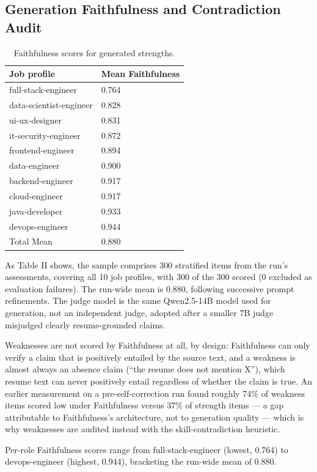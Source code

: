 \documentclass[journal]{IEEEtran}
\begin{document}
\subsection{Generation Faithfulness and Contradiction Audit}
\begin{table}[!ht]
\caption{Faithfulness scores for generated strengths.}
\label{tab_faithfulness}
\centering
\footnotesize
\begin{tabular}{ll}
\hline
Job profile & Mean Faithfulness\\
\hline
full-stack-engineer & 0.764\\
data-scientist-engineer & 0.828\\
ui-ux-designer & 0.831\\
it-security-engineer & 0.872\\
frontend-engineer & 0.894\\
data-engineer & 0.900\\
backend-engineer & 0.917\\
cloud-engineer & 0.917\\
java-developer & 0.933\\
devops-engineer & 0.944\\
Total Mean & 0.880\\
\hline
\end{tabular}
\end{table}

As Table II shows, the sample comprises 300 stratified items from the run's assessments, covering all 10 job profiles, with 300 of the 300 scored (0 excluded as evaluation failures). The run-wide mean is 0.880, following successive prompt refinements. The judge model is the same Qwen2.5-14B model used for generation, not an independent judge, adopted after a smaller 7B judge misjudged clearly resume-grounded claims.

Weaknesses are not scored by Faithfulness at all, by design: Faithfulness can only verify a claim that is positively entailed by the source text, and a weakness is almost always an absence claim (``the resume does not mention X''), which resume text can never positively entail regardless of whether the claim is true. An earlier measurement on a pre-self-correction run found roughly 74\% of weakness items scored low under Faithfulness versus 37\% of strength items --- a gap attributable to Faithfulness's architecture, not to generation quality --- which is why weaknesses are audited instead with the skill-contradiction heuristic.

Per-role Faithfulness scores range from full-stack-engineer (lowest, 0.764) to devops-engineer (highest, 0.944), bracketing the run-wide mean of 0.880.
\end{document}
